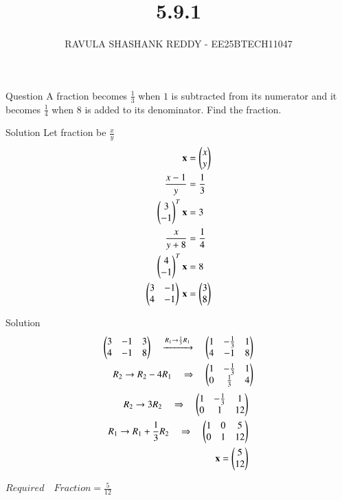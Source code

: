 \documentclass{beamer}
\title %
{5.9.1}
\author %
{RAVULA SHASHANK REDDY - EE25BTECH11047}
\begin{document}
	
	
	\frame{\titlepage}
	\begin{frame}{Question}
    A fraction becomes $\tfrac{1}{3}$ when $1$ is subtracted from its numerator and it becomes 
$\tfrac{1}{4}$ when $8$ is added to its denominator. Find the fraction.

\end{frame}
\begin{frame}{Solution}
    Let fraction be  $\tfrac{x}{y}$  
\begin{align}
\mathbf{x}&=\begin{pmatrix}x \\ y\end{pmatrix}\\
\frac{x-1}{y}&=\frac{1}{3}\\
\begin{pmatrix}3 \\ -1\end{pmatrix}^T\mathbf{x}&=3\\
\frac{x}{y+8}&=\frac{1}{4}\\
\begin{pmatrix}4 \\ -1\end{pmatrix}^T\mathbf{x}&=8\\
\begin{pmatrix}3 & -1 \\ 4 & -1\end{pmatrix}\,\mathbf{x} &= \begin{pmatrix}3 \\ 8\end{pmatrix}
\end{align}
\end{frame}
\begin{frame}{Solution}
\begin{align}
\begin{pmatrix}
3 & -1 & 3 \\
4 & -1 & 8
\end{pmatrix} \quad
\xrightarrow{R_1 \to \frac{1}{3} R_1}  \quad
\begin{pmatrix}
1 & -\frac{1}{3} & 1 \\
4 & -1 & 8
\end{pmatrix} \\
R_2 \to R_2 - 4 R_1 \quad \Rightarrow \quad
\begin{pmatrix}
1 & -\frac{1}{3} & 1 \\
0 & \frac{1}{3} & 4
\end{pmatrix}
\end{align}
\begin{align}
R_2 \to 3 R_2 \quad \Rightarrow \quad
\begin{pmatrix}
1 & -\frac{1}{3} & 1 \\
0 & 1 & 12
\end{pmatrix} \\
R_1 \to R_1 + \frac{1}{3} R_2 \quad \Rightarrow \quad
\begin{pmatrix}
1 & 0 & 5 \\
0 & 1 & 12
\end{pmatrix} \\
\mathbf{x}=\begin{pmatrix}5 \\ 12\end{pmatrix}
\end{align}
\begin{center}

$\boxed{Required\quad Fraction = \frac{5}{12}}$
\end{center}

\end{frame}
\end{document}
